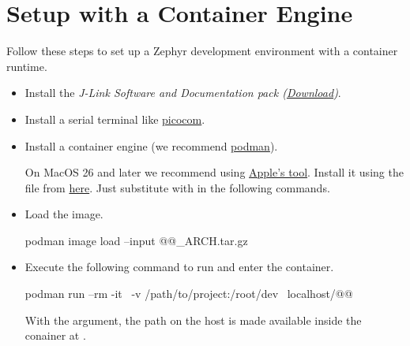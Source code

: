 \section{Setup with a Container Engine}
\label{setupwithcontainerengine}

Follow these steps to set up a Zephyr development environment with a container runtime.

\begin{itemize}
  \item Install the \emph{J-Link Software and Documentation pack (\href{https://www.segger.com/downloads/jlink}{Download})}.
  \item Install a serial terminal like \href{https://formulae.brew.sh/formula/picocom}{picocom}.
  \item Install a container engine (we recommend \href{https://podman.io/docs/installation}{podman}).
    \begin{infobox}
      On MacOS 26 and later we recommend using \href{https://opensource.apple.com/projects/container/}{Apple's  tool}.
      Install it using the  file from \href{https://github.com/apple/container/releases}{here}.
      Just substitute  with  in the following commands.
    \end{infobox}
  \item Load the image.
        \begin{monobox}
podman image load --input @\imagename{}@_ARCH.tar.gz
\end{monobox}
  \item Execute the following command to run and enter the container.
        \begin{monobox}
podman run --rm -it \
  -v /path/to/project:/root/dev \
  localhost/@\imagename{}@
\end{monobox}
    With the  argument, the  path on the host is made available inside the conainer at .
\end{itemize}
